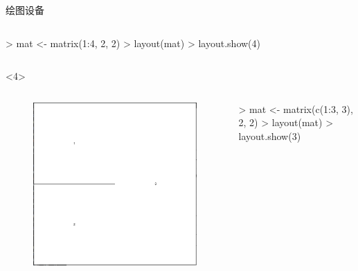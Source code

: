 \documentclass{beamerthemeMono}
\begin{document}
\begin{frame}[t, fragile]{\subsecname}{绘图设备}
\begin{overlayarea}{\textwidth}{\textheight}
\begin{onlyenv}
\begin{columns}
        \begin{column}{.6\textwidth}
 \centering
\begin{rcode}
> mat <- matrix(1:4, 2, 2)
> layout(mat)
> layout.show(4)
\end{rcode}
        \end{column}
      \end{columns}
\end{onlyenv}

\begin{onlyenv}<4>
      \begin{columns}
        \begin{column}{.4\textwidth}
          \begin{figure}
            \centering
            \includegraphics[width=0.8\columnwidth]{layout2.png}
          \end{figure}
        \end{column}

        \begin{column}{.6\textwidth}
 \centering
\begin{rcode}
> mat <- matrix(c(1:3, 3), 2, 2)
> layout(mat)
> layout.show(3)
\end{rcode}
        \end{column}
      \end{columns}
\end{onlyenv}
\end{overlayarea}
\end{frame} 
\end{document}
